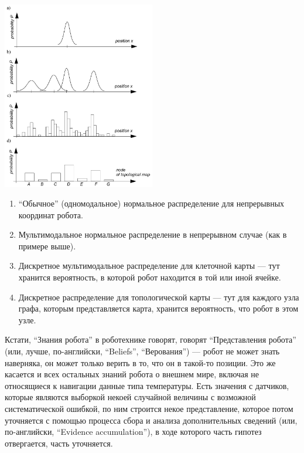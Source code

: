 \documentclass{../../text-style}
\begin{document}
\begin{center}
    \includegraphics[width=0.5\textwidth]{beliefRepresentation.png}
\end{center}

\begin{enumerate}
    \renewcommand{\labelenumi}{\alph{enumi}}
    \item \enquote{Обычное} (одномодальное) нормальное распределение для непрерывных координат робота.
    \item Мультимодальное нормальное распределение в непрерывном случае (как в примере выше).
    \item Дискретное мультимодальное распределение для клеточной карты --- тут хранится вероятность, в которой робот находится в той или иной ячейке.
    \item Дискретное распределение для топологической карты --- тут для каждого узла графа, которым представляется карта, хранится вероятность, что робот в этом узле.
\end{enumerate}

Кстати, \enquote{Знания робота} в роботехнике говорят, говорят \enquote{Представления робота} (или, лучше, по-английски, \foreignquote{english}{Beliefs}, \enquote{Верования}) --- робот не может знать наверняка, он может только верить в то, что он в такой-то позиции.
Это же касается и всех остальных знаний робота о внешнем мире, включая не относящиеся к навигации данные типа температуры.
Есть значения с датчиков, которые являются выборкой некоей случайной величины с возможной систематической ошибкой, по ним строится некое представление, которое потом уточняется с помощью процесса сбора и анализа дополнительных сведений (или, по-английски, \foreignquote{english}{Evidence accumulation}), в ходе которого часть гипотез отвергается, часть уточняется.
\end{document}
